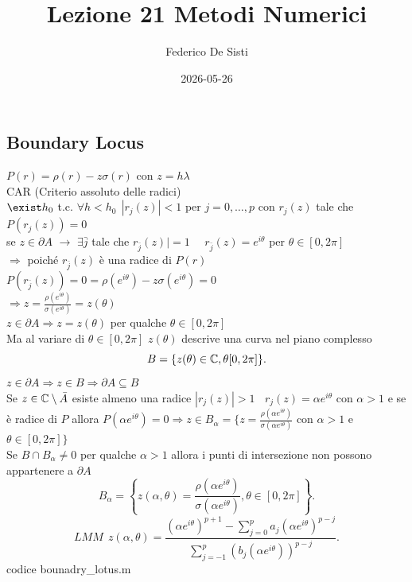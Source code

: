 \documentclass[12px]{article}
\title{Lezione 21 Metodi Numerici}
\date{2026-05-26}
\author{Federico De Sisti}
\begin{document}
	\maketitle
	\newpage
	\subsection{Boundary Locus}
	$P(r) = \rho(r) - z\sigma(r)$ con  $z = h\lambda$\\
	CAR (Criterio assoluto delle radici)\\
	$\exist h_0$ t.c. $\forall h < h_0\ \ |r_j(z)| < 1$ per $j=0,\ldots, p$ con  $r_j(z)$ tale che  $P(r_j(z)) = 0$\\
	se $z\in\partial A$  $ \rightarrow$ $\exists \bar j $ tale che  $r_{\bar j} (z)| = 1$ \ \  $r_{\bar j}(z) = e^{i\theta} $ per  $\theta\in[0,2\pi]$\\
	$ \Rightarrow $ poiché $r_{\bar j}(z)$ è una radice di  $P(r)$ \ \  $P(r_{\bar j }(z)) = 0 = \rho(e^{i\theta}) - z\sigma(e^{i\theta}) = 0$\\
	$ \Rightarrow  z = \frac{\rho(e^{i\theta})}{\sigma(e^{i\theta})} = z(\theta)$ \\
	$z\in\partial A \Rightarrow z = z(\theta)$ per qualche $\theta\in[0,2\pi]$\\
	Ma al variare di $\theta \in [0,2\pi]$  $z(\theta)$ descrive una curva nel piano complesso 
	 \[
		 B = \{z(\theta)\in\mathbb{C}, \theta[0,2\pi]\}
	.\] 
	$z\in\partial A \Rightarrow z\in B \Rightarrow  \partial A \subseteq B$\\
	Se $z\in \mathbb{C}\setminus \bar A$ esiste almeno una radice  $|r_j(z)| > 1\ \ \ \ r_j(z) = \alpha e^{i\theta} $ con  $\alpha > 1$ e se è radice di $P$ allora $P(\alpha e^{i\theta}) =0  \Rightarrow  z\in B_{\alpha} = \{z = \frac{\rho(\alpha e^{i\theta})}{\sigma (\alpha e^{i\theta})}$ con $\alpha > 1$  e $\theta\in[0,2\pi]\}$ \\
	Se $B\cap B_\alpha\neq 0$ per qualche  $\alpha > 1$ allora i punti di intersezione non possono appartenere a $\partial A$ \\
	\[
		B_\alpha = \left\{z(\alpha, \theta) = \frac{\rho(\alpha e^{i\theta})}{\sigma(\alpha e ^{i\theta})}, \theta \in [0,2\pi]\right\}
	.\] 
	 \[
	 LMM \ \ z(\alpha,\theta) = \frac{(\alpha e^{i\theta})^{p+1} - \sum^{p}_{j=0}a_j (\alpha e^{i\theta})^{p-j}}{ \sum^{p}_{j=-1}(b_j (\alpha e^{i\theta}))^{p-j}}
	.\] 
	codice bounadry_lotus.m

	
\end{document}
